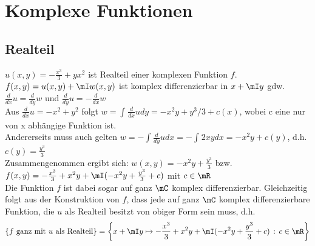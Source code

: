 
	\section{Komplexe Funktionen}

	\subsection{Realteil}
	$u(x,y)=-\frac{x^3}{3}+y x^2 $ ist Realteil einer komplexen Funktion $f$.\\
	$f(x,y)=u(x,y)+\mI w(x,y)$ ist komplex differenzierbar in $x+\mI y$ gdw. $\frac{d}{dx}u = \frac{d}{dy}w$ und $\frac{d}{dy}u = -\frac{d}{dx}w$\\
	Aus $\frac{d}{dx}u = -x^2+y^2$ folgt $w=\int_{}{} \frac{d}{dx} u dy =-x^2y+y^3/3+c(x)$, wobei c eine nur von x abhängige Funktion ist.\\
    Andererseits muss auch gelten $w=-\int_{}{} \frac{d}{dy} u dx= -\int_{}{} 2xy  dx =-x^2y+c(y)$, d.h. $c(y)=\frac{y^3}{3}$\\
	Zusammengenommen ergibt sich:
	    $w(x,y)=-x^2y+\frac{y^3}{3}$ bzw. $f(x,y)=-\frac{x^3}{3}+ x^2y +\mI(-x^2y+\frac{y^3}{3}+c)$ mit $c\in\mR$\\
Die Funktion $f$ ist dabei sogar auf ganz $\mC$ komplex differenzierbar. Gleichzeitig folgt aus der Konstruktion von $f$, dass jede auf ganz $\mC$ komplex differenzierbare Funktion, die $u$ als Realteil besitzt von obiger Form sein muss, d.h.
\begin{equation*}
\left\{f\text{ ganz mit }u\text{ als Realteil}\right\}=\left\{x+\mI y\mapsto-\frac{x^3}{3}+x^2y+\mI(-x^2y+\frac{y^3}{3}+c)\,:\,c\in\mR\right\}
\end{equation*}

